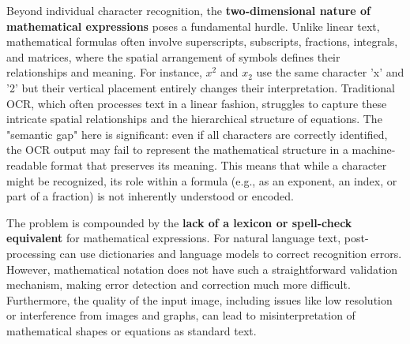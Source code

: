 Beyond individual character recognition, the \textbf{two-dimensional nature of mathematical expressions} poses a fundamental hurdle. Unlike linear text, mathematical formulas often involve superscripts, subscripts, fractions, integrals, and matrices, where the spatial arrangement of symbols defines their relationships and meaning. For instance, $x^2$ and $x_2$ use the same character 'x' and '2' but their vertical placement entirely changes their interpretation. Traditional OCR, which often processes text in a linear fashion, struggles to capture these intricate spatial relationships and the hierarchical structure of equations. The "semantic gap" here is significant: even if all characters are correctly identified, the OCR output may fail to represent the mathematical structure in a machine-readable format that preserves its meaning. This means that while a character might be recognized, its role within a formula (e.g., as an exponent, an index, or part of a fraction) is not inherently understood or encoded.

The problem is compounded by the \textbf{lack of a lexicon or spell-check equivalent} for mathematical expressions. For natural language text, post-processing can use dictionaries and language models to correct recognition errors. However, mathematical notation does not have such a straightforward validation mechanism, making error detection and correction much more difficult. Furthermore, the quality of the input image, including issues like low resolution or interference from images and graphs, can lead to misinterpretation of mathematical shapes or equations as standard text.

